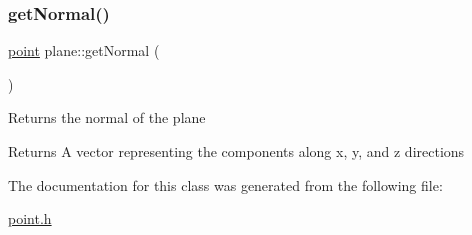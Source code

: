 \subsubsection{\texorpdfstring{get\+Normal()}{getNormal()}}
{\footnotesize\ttfamily \mbox{\hyperlink{classpoint}{point}} plane\+::get\+Normal (\begin{DoxyParamCaption}{ }\end{DoxyParamCaption})}

Returns the normal of the plane \begin{DoxyReturn}{Returns}
A vector representing the components along x, y, and z directions 
\end{DoxyReturn}


The documentation for this class was generated from the following file\+:\begin{DoxyCompactItemize}
\item 
\mbox{\hyperlink{point_8h}{point.\+h}}\end{DoxyCompactItemize}
